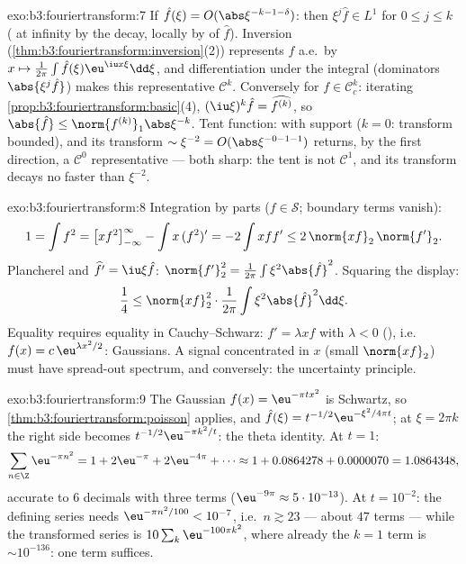 \begin{solution}{exo:b3:fouriertransform:7}
If $\hat f(\xi) = O(\abs\xi^{-k-1-\delta})$: then $\xi^j\hat f
\in L^1$ for $0 \leq j \leq k$ ( at infinity by the
decay, locally by  of $\hat f$). Inversion
(\cref{thm:b3:fouriertransform:inversion}(2)) represents $f$
a.e.\ by $x \mapsto \frac1{2\pi}\int\hat f(\xi)\eu^{\iu
x\xi}\dd\xi$, and differentiation under the integral
(dominators $\abs{\xi^j\hat f}$) makes this representative
$\mathcal C^k$. Conversely for $f \in \mathcal C_c^k$:
iterating \cref{prop:b3:fouriertransform:basic}(4),
$(\iu\xi)^k\hat f = \widehat{f^{(k)}}$, so $\abs{\hat f} \leq
\norm{f^{(k)}}_1\abs\xi^{-k}$. Tent function:  with
 support ($k = 0$: transform bounded), and its
transform $\sim \xi^{-2} = O(\abs\xi^{-0-1-1})$ returns, by
the first direction, a $\mathcal C^0$ representative --- both
sharp: the tent is not $\mathcal C^1$, and its transform
decays no faster than $\xi^{-2}$.
\end{solution}

\begin{solution}{exo:b3:fouriertransform:8}
Integration by parts ($f \in \mathcal S$; boundary terms
vanish):
\[
1 = \int f^2 = \bigl[xf^2\bigr]_{-\infty}^{\infty} - \int
x\,(f^2)' = -2\int xff' \leq 2\,\norm{xf}_2\,\norm{f'}_2 .
\]
Plancherel and $\widehat{f'} = \iu\xi\hat f$:
$\norm{f'}_2^2 = \frac1{2\pi}\int\xi^2\abs{\hat f}^2$. Squaring
the display:
\[
\frac14 \leq \norm{xf}_2^2\cdot\frac1{2\pi}
\int\xi^2\abs{\hat f}^2\dd\xi .
\]
Equality requires equality in Cauchy--Schwarz: $f' =
\lambda xf$ with $\lambda < 0$ (), i.e.\ $f(x) =
c\,\eu^{\lambda x^2/2}$: Gaussians. A signal concentrated in
$x$ (small $\norm{xf}_2$) must have spread-out spectrum, and
conversely: the uncertainty principle.
\end{solution}

\begin{solution}{exo:b3:fouriertransform:9}
The Gaussian $f(x) = \eu^{-\pi tx^2}$ is Schwartz, so
\cref{thm:b3:fouriertransform:poisson} applies, and
$\hat f(\xi) = t^{-1/2}\eu^{-\xi^2/4\pi t}$; at $\xi = 2\pi
k$ the right side becomes $t^{-1/2}\eu^{-\pi k^2/t}$: the
theta identity. At $t = 1$:
\[
\sum_{n\in\Z}\eu^{-\pi n^2} = 1 + 2\eu^{-\pi} + 2\eu^{-4\pi} +
\cdots \approx 1 + 0.0864278 + 0.0000070 = 1.0864348,
\]
accurate to $6$ decimals with three terms ($\eu^{-9\pi}
\approx 5\cdot10^{-13}$). At $t = 10^{-2}$: the defining
series needs $\eu^{-\pi n^2/100} < 10^{-7}$, i.e.\ $n \gtrsim
23$ --- about $47$ terms --- while the transformed series is
$10\sum_k\eu^{-100\pi k^2}$, where already the $k = 1$ term is
$\sim 10^{-136}$: one term suffices.
\end{solution}

